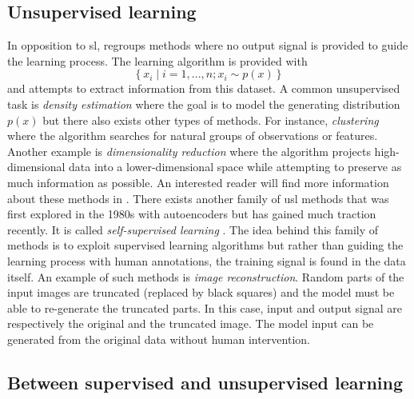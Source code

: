 \subsection{Unsupervised learning}
\label{ssec:backml:usl}

In opposition to \acrlong{sl},  regroups methods where no output signal is provided to guide the learning process. The learning algorithm is provided with 
\begin{equation}
\left\{x_i \mid i = 1,..., n ; x_i \sim p(x)\right\}
\end{equation} 
and attempts to extract information from this dataset. A common unsupervised task is \textit{density estimation} where the goal is to model the generating distribution $p(x)$ but there also exists other types of methods. For instance, \textit{clustering} where the algorithm searches for natural groups of observations or features. Another example is \textit{dimensionality reduction} where the algorithm projects high-dimensional data into a lower-dimensional space while attempting to preserve as much information as possible. An interested reader will find more information about these methods in \parencite{friedman2017elements}. There exists another family of \acrlong{usl} methods that was first explored in the 1980s with autoencoders but has gained much traction recently. It is called \textit{self-supervised learning} \parencite{lecun2021self}. The idea behind this family of methods is to exploit supervised learning algorithms but rather than guiding the learning process with human annotations, the training signal is found in the data itself. An example of such methods is \textit{image reconstruction}. Random parts of the input images are truncated (\eg replaced by black squares) and the model must be able to re-generate the truncated parts. In this case, input and output signal are respectively the original and the truncated image. The model input can be generated from the original data without human intervention. 

\subsection{Between supervised and unsupervised learning}
\label{ssec:backml:inbetween}

